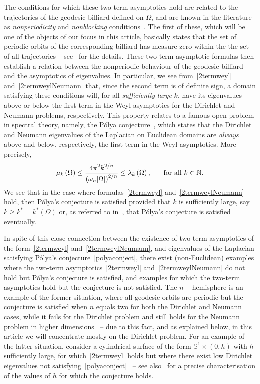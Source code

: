 \documentclass[11pt,a4paper,times]{amsart}
\theoremstyle{plain}
\theoremstyle{definition}
\numberwithin{equation}{section}
\newcommand{\ds}{\displaystyle}
\newcommand{\N}{\mathbb{N}}
\begin{document}
The conditions for which these two-term asymptotics hold are related to the trajectories of the geodesic billiard
defined on $\Omega$, and are known in the literature as {\it nonperiodicity} and {\it nonblocking}
conditions~\cite{sava}. The first of these,
which will be one of the objects of our focus in this article, basically states that the set of periodic orbits of
the corresponding billiard has measure zero within the the set of all trajectories -- see~\cite{sava} for the
details.
These two-term asymptotic formulas then establish a relation between the nonperiodic behaviour of the geodesic
billiard and the asymptotics of eigenvalues. In particular, we see from~\eqref{2termweyl}
and~\eqref{2termweylNeumann} that, since the second term is of definite sign, a domain satisfying these conditions
will, for all {\it sufficiently large} $k$, have its eigenvalues above or below the first term in the Weyl
asymptotics for the Dirichlet and Neumann problems, respectively. This property relates to a famous open problem
in spectral theory, namely, the P\'{o}lya conjecture~\cite{poly1,poly2}, which states that the Dirichlet and
Neumann eigenvalues of the Laplacian on Euclidean domains are {\it always} above and below, respectively, the first
term in the Weyl asymptotics. More precisely,
\begin{equation}\label{polyaconject}
 \mu_{k}\left(\Omega\right) \leq \frac{\ds 4\pi^2k^{2/n}}{\ds \left(\omega_{n}|\Omega|\right)^{2/n}} \leq
 \lambda_{k}\left(\Omega\right), \hspace*{5mm} \mbox{ for all } k\in\N.
\end{equation}
We see that in the case where formulas~\eqref{2termweyl} and~\eqref{2termweylNeumann} hold, then P\'{o}lya's
conjecture is satisfied provided that $k$ is sufficiently large, say $k\geq k^{*}=k^{*}\left(\Omega\right)$ or,
as referred to in~\cite{fs}, that P\'{o}lya's conjecture is satisfied eventually.

In spite of this close connection between the existence of two-term asymptotics of the form~\eqref{2termweyl}
and~\eqref{2termweylNeumann}, and eigenvalues of the Laplacian satisfying P\'{o}lya's
conjecture~\eqref{polyaconject}, there exist (non-Euclidean) examples where the two-term
asymptotics~\eqref{2termweyl} and~\eqref{2termweylNeumann} do not
hold but P\'{o}lya's conjecture is satisfied, and examples for which the two-term asymptotics hold but the
conjecture is not satisfied. The $n-$hemisphere is an example of the former situation, where all geodesic orbits are
periodic but the conjecture is satisfied when $n$ equals two for both the Dirichlet and Neumann cases, while it
fails for the Dirichlet problem and still holds for the Neumann problem in higher dimensions~\cite{bb,blps,fms} --
due to this fact, and as explained below, in this article we will concentrate mostly on the Dirichlet problem. For
an example of the latter situation, consider a cylindrical surface of the form $\mathbb{S}^{1}\times(0,h)$ with $h$
sufficiently large, for which~\eqref{2termweyl} holds but where there exist low Dirichlet eigenvalues not
satisfying~\eqref{polyaconject}~\cite{fs} -- see also~\cite{frwa} for
a precise characterisation of the values of $h$ for which the conjecture holds.
\end{document}
